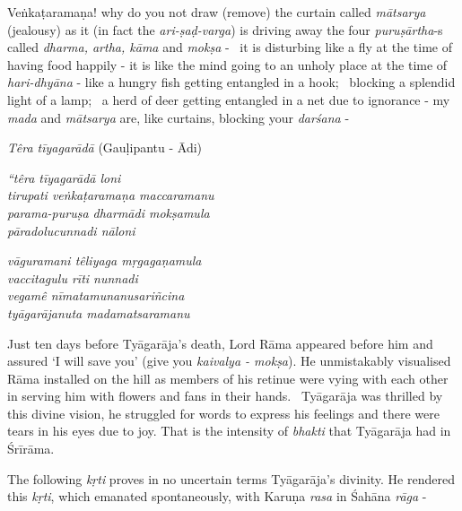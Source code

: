 Veṅkaṭaramaṇa! why do you not draw (remove) the curtain called \textit{mātsarya} (jealousy) as it (in fact the \textit{ari-ṣaḍ-varga}) is driving away the four \textit{puruṣārtha}-s called \textit{dharma, artha, kāma} and \textit{mokṣa} -  it is disturbing like a fly at the time of having food happily - it is like the mind going to an unholy place at the time of \textit{hari-dhyāna} - like a hungry fish getting entangled in a hook;  blocking a splendid light of a lamp;  a herd of deer getting entangled in a net due to ignorance - my \textit{mada} and \textit{mātsarya} are, like curtains, blocking your \textit{darśana} -  

\textit{Têra tīyagarādā} (Gauḷipantu - Ādi)

\begin{centerquote}
\textit{“têra tīyagarādā loni}\\ \textit{tirupati veṅkaṭaramaṇa maccaramanu}\\ \textit{parama-puruṣa dharmādi mokṣamula}\\ \textit{pāradolucunnadi nāloni}
\end{centerquote}

\begin{centerquote}
\textit{vāguramani têliyaga mṛgagaṇamula}\\ \textit{vaccitagulu rīti nunnadi}\\ \textit{vegamê nīmatamunanusariñcina}\\ \textit{tyāgarājanuta madamatsaramanu}
\end{centerquote}

Just ten days before Tyāgarāja’s death, Lord Rāma appeared before him and assured ‘I will save you’ (give you \textit{kaivalya - mokṣa}). He unmistakably visualised Rāma installed on the hill as members of his retinue were vying with each other in serving him with flowers and fans in their hands.  Tyāgarāja was thrilled by this divine vision, he struggled for words to express his feelings and there were tears in his eyes due to joy. That is the intensity of \textit{bhakti} that Tyāgarāja had in Śrīrāma.

The following \textit{kṛti} proves in no uncertain terms Tyāgarāja’s divinity. He rendered this \textit{kṛti}, which emanated spontaneously, with Karuṇa \textit{rasa} in Śahāna \textit{rāga} - 

